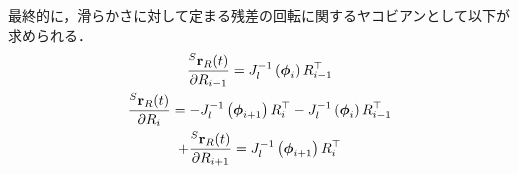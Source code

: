 最終的に，滑らかさに対して定まる残差の回転に関するヤコビアンとして以下が求められる．
%
\begin{align}
  \begin{gathered}
    \frac{ {}^{S}{\bf r}_{R}(t) }{ \partial R_{i-1} }
    = 
    J_{l}^{-1} \left( \boldsymbol \phi_{i} \right) R_{i-1}^{\top} \\
    \frac{ {}^{S}{\bf r}_{R}(t) }{ \partial R_{i} }
    = 
    -J_{l}^{-1} \left( \boldsymbol \phi_{i+1} \right) R_{i}^{\top}
    -J_{l}^{-1} \left( \boldsymbol \phi_{i} \right) R_{i-1}^{\top} \\
    +
    \frac{ {}^{S}{\bf r}_{R}(t) }{ \partial R_{i+1} }
    = 
    J_{l}^{-1} \left( \boldsymbol \phi_{i+1} \right) R_{i}^{\top} \\
  \end{gathered}
\end{align}






